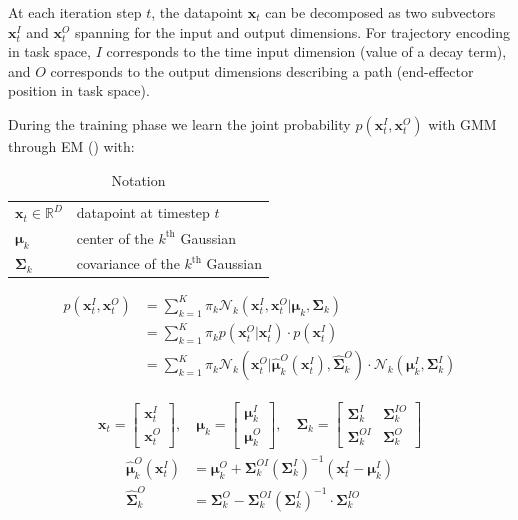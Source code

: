 \documentclass{article}
\begin{document}
At each iteration step $t$, the datapoint $\bm{x}_{t}$ can be decomposed as two subvectors $\bm{x}_{t}^{I}$ and $\bm{x}_{t}^{O}$ spanning for the input and output dimensions. For trajectory encoding in task space, $I$ corresponds to the time input dimension (\eg value of a decay term), and $O$ corresponds to the output dimensions describing a path (\eg end-effector position in task space).

During the training phase we learn the joint probability $p(\bm{x}_{t}^{I}, \bm{x}_{t}^{O})$ with GMM through EM () with:
\begin{table}[h]
  \centering
  \caption{Notation}
  \begin{tabular}{ll}
    \toprule
    $\bm{x}_{t} \in \mathbb{R}^{D}$ & datapoint at timestep $t$\\
    $\bm{\mu}_{k}$ & center of the $k^{\text{th}}$ Gaussian\\
    $\bm{\Sigma}_{k}$ & covariance of the $k^{\text{th}}$ Gaussian\\
    \bottomrule
  \end{tabular}
\end{table}

\begin{align}
  p(\bm{x}_{t}^{I}, \bm{x}_{t}^{O}) &=  \sum_{k=1}^{K}\pi_{k} \mathcal{N}_{k}(\bm{x}_{t}^{I}, \bm{x}_{t}^{O}|\bm{\mu}_{k}, \bm{\Sigma}_{k})\\
  &=  \sum_{k=1}^{K}\pi_{k} p(\bm{x}_{t}^{O}|\bm{x}_{t}^{I}) \cdot p(\bm{x}_{t}^{I})\\
  &=  \sum_{k=1}^{K}\pi_{k} \mathcal{N}_{k}(\bm{x}_{t}^{O}|\hat{\bm{\mu}}_{k}^{O}(\bm{x}_{t}^{I}), \hat{\bm{\Sigma}}_{k}^{O}) \cdot \mathcal{N}_{k}(\bm{\mu}_{k}^{I}, \bm{\Sigma}_{k}^{I})
\end{align}

\begin{gather}
  \bm{x}_{t} =
  \begin{bmatrix}
    \bm{x}_{t}^{I} \\[0.5em]
    \bm{x}_{t}^{O}
  \end{bmatrix}, \quad
  \bm{\mu}_{k} =
  \begin{bmatrix}
    \bm{\mu}_{k}^{I} \\[0.5em]
    \bm{\mu}_{k}^{O}
  \end{bmatrix}, \quad
  \bm{\Sigma}_{k} =
  \begin{bmatrix}
    \bm{\Sigma}_{k}^{I} & \bm{\Sigma}_{k}^{IO}\\[0.5em]
    \bm{\Sigma}_{k}^{OI} & \bm{\Sigma}_{k}^{O}
  \end{bmatrix}
\end{gather}
\begin{align}
  \hat{\bm{\mu}}_{k}^{O}(\bm{x}_{t}^{I}) &= \bm{\mu}_{k}^{O} + \bm{\Sigma}_{k}^{OI}  (\bm{\Sigma}_{k}^{I})^{-1}  (\bm{x}_{t}^{I} - \bm{\mu}_{k}^{I})\\
  \hat{\bm{\Sigma}}_{k}^{O} &= \bm{\Sigma}_{k}^{O} - \bm{\Sigma}_{k}^{OI}  (\bm{\Sigma}_{k}^{I})^{-1} \cdot \bm{\Sigma}_{k}^{IO}
\end{align}
\end{document}
